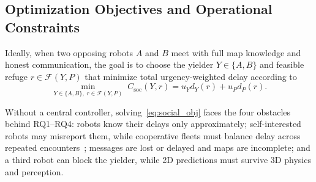 \subsection{Optimization Objectives and Operational Constraints}
Ideally, when two opposing robots $A$ and $B$ meet with full map knowledge and honest communication, the goal is to choose the yielder $Y \in \{A, B\}$ and feasible refuge $r \in \mathcal{F}(Y, P)$ that minimize total urgency-weighted delay according to
\begin{equation}
\min_{Y \in \{A, B\},\; r \in \mathcal{F}(Y, P)} \; C_{\mathrm{soc}}(Y, r) = u_Y d_Y(r) + u_P d_P(r).
\label{eq:social_obj}
\end{equation}

Without a central controller, solving~\eqref{eq:social_obj} faces the four obstacles behind RQ1--RQ4: robots know their delays only approximately; self-interested robots may misreport them, while cooperative fleets must balance delay across repeated encounters~\cite{jain1984fairness}; messages are lost or delayed and maps are incomplete; and a third robot can block the yielder, while 2D predictions must survive 3D physics and perception.
